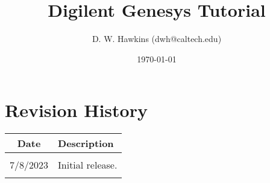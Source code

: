 \documentclass[10pt,twoside]{article}
\begin{document}
\title{Digilent Genesys Tutorial}
\author{D. W. Hawkins (dwh@caltech.edu)}
\date{\today}

\maketitle

\tableofcontents

\pagestyle{fancy}

\clearpage

%

\clearpage

\clearpage


\appendix
\clearpage
\section{Revision History}
%

\begin{table}[h]
\begin{center}
\begin{tabular}{|c|p{100mm}|}
\hline
Date & Description\\
\hline\hline
&\\
7/8/2023  & Initial release.\\
&\\
\hline
\end{tabular}
\end{center}
\end{table}

%
%



\end{document}
